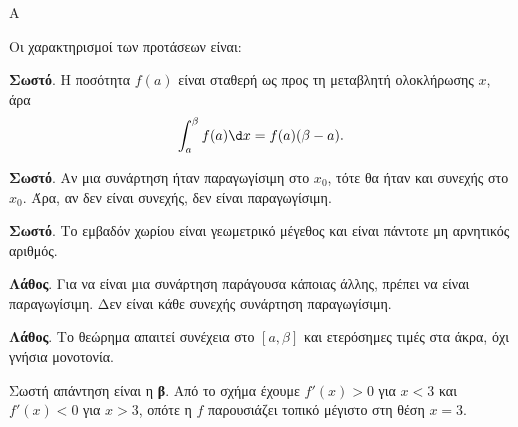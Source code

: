 \begin{thema}{Α}
\begin{erwthma}
\item {}

\item {}

\item {}

\item Οι χαρακτηρισμοί των προτάσεων είναι:
\begin{alist}
\item \textbf{Σωστό}. Η ποσότητα $f(a)$ είναι σταθερή ως προς τη μεταβλητή ολοκλήρωσης $x$, άρα
\[ \dint_a^\beta f(a)\d x=f(a)(\beta-a). \]
\item \textbf{Σωστό}. Αν μια συνάρτηση ήταν παραγωγίσιμη στο $x_0$, τότε θα ήταν και συνεχής στο $x_0$. Άρα, αν δεν είναι συνεχής, δεν είναι παραγωγίσιμη.
\item \textbf{Σωστό}. Το εμβαδόν χωρίου είναι γεωμετρικό μέγεθος και είναι πάντοτε μη αρνητικός αριθμός.
\item \textbf{Λάθος}. Για να είναι μια συνάρτηση παράγουσα κάποιας άλλης, πρέπει να είναι παραγωγίσιμη. Δεν είναι κάθε συνεχής συνάρτηση παραγωγίσιμη.
\item \textbf{Λάθος}. Το θεώρημα  απαιτεί συνέχεια στο $[a,\beta]$ και ετερόσημες τιμές στα άκρα, όχι γνήσια μονοτονία.
\end{alist}

\item Σωστή απάντηση είναι η \textbf{β}. Από το σχήμα έχουμε $f'(x)>0$ για $x<3$ και $f'(x)<0$ για $x>3$, οπότε η $f$ παρουσιάζει τοπικό μέγιστο στη θέση $x=3$.
\end{erwthma}
\end{thema}

